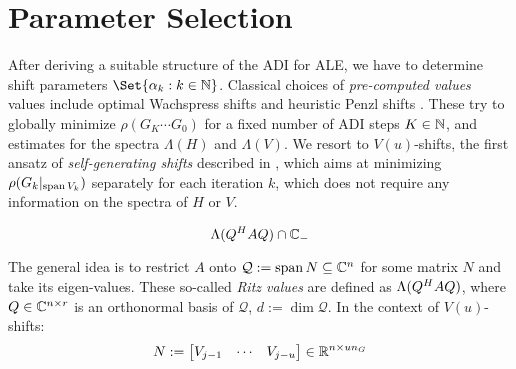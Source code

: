 \section{Parameter Selection}
\label{sec:adi:parameters}

After deriving a suitable structure of the \ac{ADI} for \ac{ALE},
we have to determine shift parameters $\Set{\alpha_k : k\in\N}$.
Classical choices of \emph{pre-computed values} values include
optimal Wachspress shifts \cite{Wachspress1992,Wachspress2013} and
heuristic Penzl shifts \cite{Penzl1999}.
These try to globally minimize $\rho(G_K \cdots G_0)$ for a fixed number of \ac{ADI} steps $K\in\mathbb{N}$,
and estimates for the spectra $\Lambda(H)$ and $\Lambda(V)$.
We resort to $V(u)$-shifts, the first ansatz of \emph{self-generating shifts} described in \cite[Section~5.3]{Kuerschner2016},
which aims at minimizing
$\rho(G_k |_{\operatorname{span} V_k})$
separately for each iteration $k$,
which does not require any information on the spectra of $H$ or $V$.


\begin{equation*}
  \Lambda(Q^H A Q) \cap \mathbb{C}_-
\end{equation*}

The general idea is to restrict $A$ onto
$\mathcal Q := \operatorname{span} N \subseteq \mathbb{C}^n$
for some matrix $N$ and take its eigen-values.
These so-called \emph{Ritz values} are defined as $\Lambda(Q^H A Q)$,
where $Q\in\mathbb{C}^{n\times r}$ is an orthonormal basis of $\mathcal Q$, $d := \dim\mathcal Q$.
In the context of $V(u)$-shifts:
\begin{equation}
  N := \begin{bmatrix}
    V_{j-1} &
    \cdots &
    V_{j-u}
  \end{bmatrix}
  \in \mathbb{R}^{n\times u n_G}
\end{equation}

